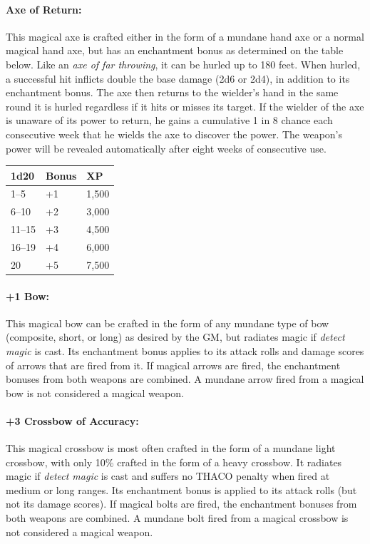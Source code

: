 \begin{multicols}{2}
\paragraph{Axe of Return:} This magical axe is crafted either in the form of a mundane hand axe or a normal magical hand axe, but has an enchantment bonus as determined on the table below.  Like an \textit{axe of far throwing}, it can be hurled up to 180 feet. When hurled, a successful hit inflicts double the base damage (2d6 or 2d4), in addition to its enchantment bonus.  The axe then returns to the wielder's hand in the same round it is hurled regardless if it hits or misses its target.  If the wielder of the axe is unaware of its power to return, he gains a cumulative 1 in 8 chance each consecutive week that he wields the axe to discover the power.  The weapon's power will be revealed automatically after eight weeks of consecutive use.

\noindent \begin{tabular}{|p{}|p{}|p{}|}
\hline
1d20	& Bonus	& XP \\
\hline\hline
\rowcolor[gray]{0.9}1--5	& +1	& 1,500 \\
6--10	& +2	& 3,000 \\
\rowcolor[gray]{0.9}11--15	& +3	& 4,500 \\
16--19	& +4	& 6,000 \\
\rowcolor[gray]{0.9}20	& +5	& 7,500 \\
\hline
\end{tabular}

\paragraph{+1 Bow:} This magical bow can be crafted in the form of any mundane type of bow (composite, short, or long) as desired by the GM, but radiates magic if \textit{detect magic} is cast.  Its enchantment bonus applies to its attack rolls and damage scores of arrows that are fired from it.  If magical arrows are fired, the enchantment bonuses from both weapons are combined.  A mundane arrow fired from a magical bow is not considered a magical weapon.

\paragraph{+3 Crossbow of Accuracy:} This magical crossbow is most often crafted in the form of a mundane light crossbow, with only 10\% crafted in the form of a heavy crossbow.  It radiates magic if \textit{detect magic} is cast and suffers no THACO penalty when fired at medium or long ranges.  Its enchantment bonus is applied to its attack rolls (but not its damage scores).  If magical bolts are fired, the enchantment bonuses from both weapons are combined.  A mundane bolt fired from a magical crossbow is not considered a magical weapon.


\end{multicols}
